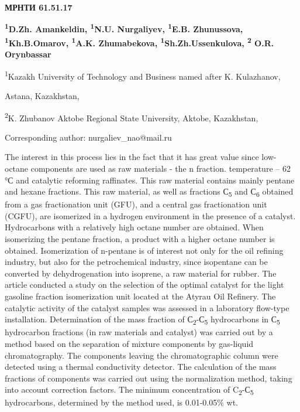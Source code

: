 \newpage
{\bfseries МРНТИ 61.51.17}


\begin{center}
{\bfseries \textsuperscript{1}D.Zh. Amankeldin, \textsuperscript{1}N.U. Nurgaliyev, \textsuperscript{1}E.B. Zhunussova, \textsuperscript{1}Kh.B.Omarov, \textsuperscript{1}A.K. Zhumabekova, \textsuperscript{1}Sh.Zh.Ussenkulova, \textsuperscript{2} O.R. Orynbassar}

\textsuperscript{1}Kazakh University of Technology and Business named
after K. Kulazhanov,

Astana, Kazakhstan,

\textsuperscript{2}K. Zhubanov Aktobe Regional State University, Aktobe,
Kazakhstan,

Corresponding author: nurgaliev\_nao@mail.ru
\end{center}

The interest in this process lies in the fact that it has great value
since low-octane components are used as raw materials - the n fraction.
temperature -- 62 °С and catalytic reforming raffinates. This raw
material contains mainly pentane and hexane fractions. This raw
material, as well as fractions С\textsubscript{5} and С\textsubscript{6}
obtained from a gas fractionation unit (GFU), and a central gas
fractionation unit (CGFU), are isomerized in a hydrogen environment in
the presence of a catalyst. Hydrocarbons with a relatively high octane
number are obtained. When isomerizing the pentane fraction, a product
with a higher octane number is obtained. Isomerization of n-pentane is
of interest not only for the oil refining industry, but also for the
petrochemical industry, since isopentane can be converted by
dehydrogenation into isoprene, a raw material for rubber. The article
conducted a study on the selection of the optimal catalyst for the light
gasoline fraction isomerization unit located at the Atyrau Oil Refinery.
The catalytic activity of the catalyst samples was assessed in a
laboratory flow-type installation. Determination of the mass fraction of
С\textsubscript{2}-С\textsubscript{5} hydrocarbons in С\textsubscript{5}
hydrocarbon fractions (in raw materials and catalyst) was carried out by
a method based on the separation of mixture components by gas-liquid
chromatography. The components leaving the chromatographic column were
detected using a thermal conductivity detector. The calculation of the
mass fractions of components was carried out using the normalization
method, taking into account correction factors. The minimum
concentration of C\textsubscript{2}-С\textsubscript{5} hydrocarbons,
determined by the method used, is 0.01-0.05\% wt.

